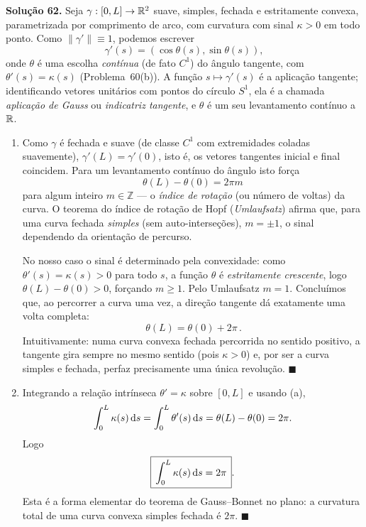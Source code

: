 \bigskip\noindent\textbf{Solução 62.}\quad
Seja $\gamma:[0,L]\to\mathbb{R}^2$ suave, simples, fechada e estritamente convexa, parametrizada por comprimento de arco, com curvatura com sinal $\kappa>0$ em todo ponto. Como $\|\gamma'\|\equiv1$, podemos escrever
\[
\gamma'(s)=(\cos\theta(s),\sin\theta(s)),
\]
onde $\theta$ é uma escolha \emph{contínua} (de fato $C^1$) do ângulo tangente, com $\theta'(s)=\kappa(s)$ (Problema~60(b)). A função $s\mapsto\gamma'(s)$ é a aplicação tangente; identificando vetores unitários com pontos do círculo $S^1$, ela é a chamada \emph{aplicação de Gauss} ou \emph{indicatriz tangente}, e $\theta$ é um seu levantamento contínuo a $\mathbb{R}$.

\begin{enumerate}[label=(\alph*)]

\item Como $\gamma$ é fechada e suave (de classe $C^1$ com extremidades coladas suavemente), $\gamma'(L)=\gamma'(0)$, isto é, os vetores tangentes inicial e final coincidem. Para um levantamento contínuo do ângulo isto força
\[
\theta(L)-\theta(0)=2\pi m
\]
para algum inteiro $m\in\mathbb{Z}$ --- o \emph{índice de rotação} (ou número de voltas) da curva. O teorema do índice de rotação de Hopf (\emph{Umlaufsatz}) afirma que, para uma curva fechada \emph{simples} (sem auto-interseções), $m=\pm1$, o sinal dependendo da orientação de percurso.

No nosso caso o sinal é determinado pela convexidade: como $\theta'(s)=\kappa(s)>0$ para todo $s$, a função $\theta$ é \emph{estritamente crescente}, logo $\theta(L)-\theta(0)>0$, forçando $m\ge1$. Pelo Umlaufsatz $m=1$. Concluímos que, ao percorrer a curva uma vez, a direção tangente dá exatamente uma volta completa:
\[
\boxed{\,\theta(L)=\theta(0)+2\pi\,}.
\]
Intuitivamente: numa curva convexa fechada percorrida no sentido positivo, a tangente gira sempre no mesmo sentido (pois $\kappa>0$) e, por ser a curva simples e fechada, perfaz precisamente uma única revolução. \qquad$\blacksquare$

\item Integrando a relação intrínseca $\theta'=\kappa$ sobre $[0,L]$ e usando (a),
\[
\int_0^L\kappa(s)\,\mathrm{d} s=\int_0^L\theta'(s)\,\mathrm{d} s=\theta(L)-\theta(0)=2\pi.
\]
Logo
\[
\boxed{\,\int_0^L\kappa(s)\,\mathrm{d} s=2\pi\,}.
\]
Esta é a forma elementar do teorema de Gauss--Bonnet no plano: a curvatura total de uma curva convexa simples fechada é $2\pi$. \qquad$\blacksquare$


\end{enumerate}
